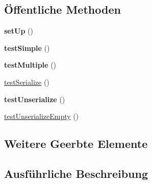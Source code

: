 \subsection*{Öffentliche Methoden}
\begin{DoxyCompactItemize}
\item 
\mbox{\label{class_sabre_1_1_cal_d_a_v_1_1_xml_1_1_property_1_1_supported_calendar_component_set_test_ac41cca02cfcf3ce289ab7f3abe9c12ae}} 
{\bfseries set\+Up} ()
\item 
\mbox{\label{class_sabre_1_1_cal_d_a_v_1_1_xml_1_1_property_1_1_supported_calendar_component_set_test_a302b72762256d57c1f5010e3f8988594}} 
{\bfseries test\+Simple} ()
\item 
\mbox{\label{class_sabre_1_1_cal_d_a_v_1_1_xml_1_1_property_1_1_supported_calendar_component_set_test_a31a486eaaab5de03829e146bfe9895a6}} 
{\bfseries test\+Multiple} ()
\item 
\mbox{\hyperlink{class_sabre_1_1_cal_d_a_v_1_1_xml_1_1_property_1_1_supported_calendar_component_set_test_afa8c214b510aabe79da9333ddf7dedfb}{test\+Serialize}} ()
\item 
\mbox{\label{class_sabre_1_1_cal_d_a_v_1_1_xml_1_1_property_1_1_supported_calendar_component_set_test_a54dd55c7753a96c9a13a2884a5eb45b4}} 
{\bfseries test\+Unserialize} ()
\item 
\mbox{\hyperlink{class_sabre_1_1_cal_d_a_v_1_1_xml_1_1_property_1_1_supported_calendar_component_set_test_a8588e9e29e9d3086c7e3d3a8db01f469}{test\+Unserialize\+Empty}} ()
\end{DoxyCompactItemize}
\subsection*{Weitere Geerbte Elemente}


\subsection{Ausführliche Beschreibung}


